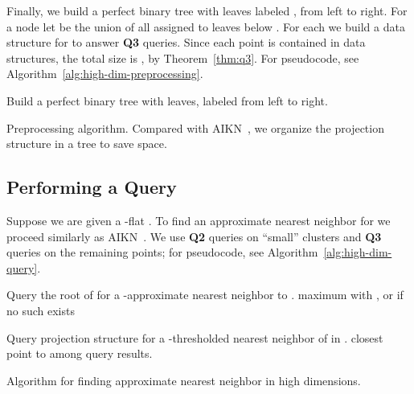 \documentclass[a4paper,11pt]{paper}
\newenvironment{alg}{\begin{algorithm}[htbp]}{\end{algorithm}}
\begin{document}
Finally, we build a perfect binary tree  with  leaves
labeled , from left to right.
For a node 
let  be the union of all  assigned to leaves below .
For each  we build
a data structure for  to answer \textbf{Q3} queries.
Since each point is contained in  data structures,
the total size is , by
Theorem~\ref{thm:q3}.
For pseudocode, see Algorithm~\ref{alg:high-dim-preprocessing}.

\begin{alg}
\DontPrintSemicolon
{}
\;
Build a perfect binary tree  with  leaves,
labeled  from left to right.\;
\caption{Preprocessing algorithm. Compared
  with AIKN~\cite{AndoniInKrNg09}, we
  organize the  projection structure in a tree to save space.}
\label{alg:high-dim-preprocessing}
\end{alg}

\subsection{Performing a Query}
Suppose we are given a -flat .
To find an approximate nearest neighbor
for  we proceed similarly as AIKN~\cite{AndoniInKrNg09}. We use
\textbf{Q2} queries on
``small'' clusters  and \textbf{Q3} queries on the remaining points;
for pseudocode, see Algorithm~\ref{alg:high-dim-query}.

\begin{alg}
  \DontPrintSemicolon
{}
  Query the root of  for a
  -approximate nearest neighbor  to .
  \;
   maximum
   with ,
  or 
  if no such  exists\;

  Query projection structure for a
  -thresholded nearest neighbor of  in
  .
  \Return closest point to  among query results.
 \caption{Algorithm for finding approximate nearest neighbor in
   high dimensions.}
 \label{alg:high-dim-query}
\end{alg}
\end{document}
